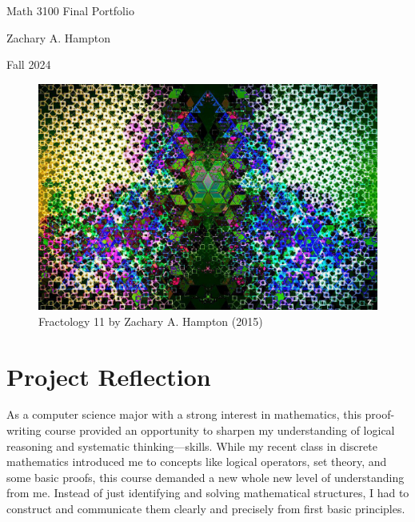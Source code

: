 \documentclass[12pt]{article}
\theoremstyle{definition}
\begin{document}
\begin{titlepage}
\begin{center}
    \LARGE{Math 3100 Final Portfolio}
    
    \bigskip
    
    \Large{Zachary A. Hampton}
    
    \medskip
    
    \Large{Fall 2024}
\end{center}

 \vfill
    
    \begin{figure}[h]
        \centering
        \includegraphics[width=.8\textwidth]{fractology_11_ZAHAMPTON.jpg}
        \caption{Fractology 11 by Zachary A. Hampton (2015) \cite{Flower08}}
        \label{fig:my_label}
    \end{figure}
    
    \vfill
\end{titlepage}

\tableofcontents


\section{Project Reflection}

As a computer science major with a strong interest in mathematics, this proof-writing course provided an opportunity to sharpen my understanding of logical reasoning and systematic thinking—skills. While my recent class in discrete mathematics introduced me to concepts like logical operators, set theory, and some basic proofs, this course demanded a new whole new level of understanding from me. Instead of just identifying and solving mathematical structures, I had to construct and communicate them clearly and precisely from first basic principles.
\end{document}
